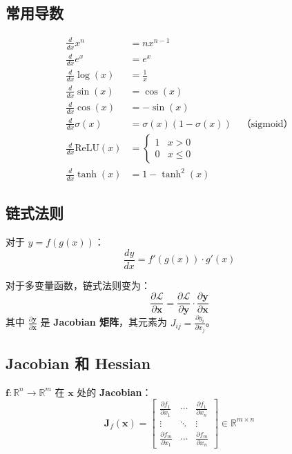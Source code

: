 \subsection{常用导数}

\begin{align}
\frac{d}{dx}x^n &= nx^{n-1} \\
\frac{d}{dx}e^x &= e^x \\
\frac{d}{dx}\log(x) &= \frac{1}{x} \\
\frac{d}{dx}\sin(x) &= \cos(x) \\
\frac{d}{dx}\cos(x) &= -\sin(x) \\
\frac{d}{dx}\sigma(x) &= \sigma(x)(1 - \sigma(x)) \quad \text{（sigmoid）} \\
\frac{d}{dx}\text{ReLU}(x) &= \begin{cases} 1 & x > 0 \\ 0 & x \leq 0 \end{cases} \\
\frac{d}{dx}\tanh(x) &= 1 - \tanh^2(x)
\end{align}

\subsection{链式法则}

对于 $y = f(g(x))$：
\begin{equation}
\frac{dy}{dx} = f'(g(x)) \cdot g'(x)
\end{equation}

对于多变量函数，链式法则变为：
\begin{equation}
\frac{\partial \mathcal{L}}{\partial \mathbf{x}} = \frac{\partial \mathcal{L}}{\partial \mathbf{y}} \cdot \frac{\partial \mathbf{y}}{\partial \mathbf{x}}
\end{equation}
其中 $\frac{\partial \mathbf{y}}{\partial \mathbf{x}}$ 是 \textbf{Jacobian 矩阵}，其元素为 $J_{ij} = \frac{\partial y_i}{\partial x_j}$。

\subsection{Jacobian 和 Hessian}

$\mathbf{f}: \mathbb{R}^n \to \mathbb{R}^m$ 在 $\mathbf{x}$ 处的 \textbf{Jacobian}：
\begin{equation}
\mathbf{J}_f(\mathbf{x}) = \begin{bmatrix}
\frac{\partial f_1}{\partial x_1} & \cdots & \frac{\partial f_1}{\partial x_n} \\
\vdots & \ddots & \vdots \\
\frac{\partial f_m}{\partial x_1} & \cdots & \frac{\partial f_m}{\partial x_n}
\end{bmatrix} \in \mathbb{R}^{m \times n}
\end{equation}

